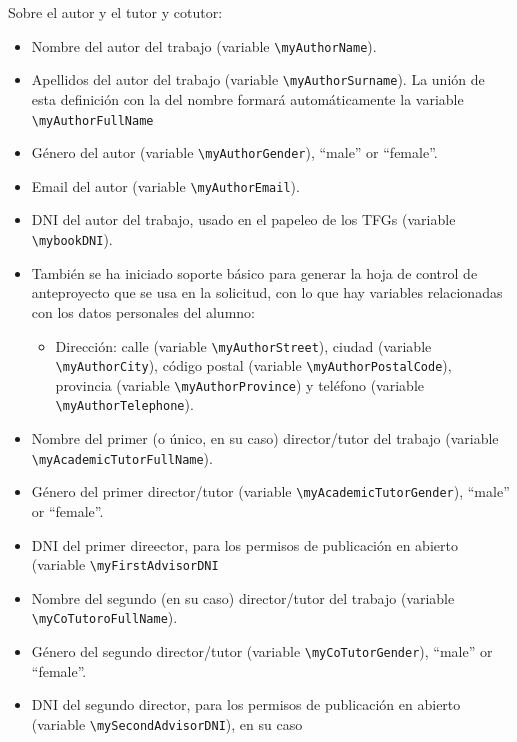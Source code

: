 \documentclass[spanish,openright]{book}
\begin{document}
Sobre el autor y el tutor y cotutor:

\begin{itemize}

\item Nombre del autor del trabajo (variable
\texttt{\textbackslash{}myAuthorName}).
\item Apellidos del autor del trabajo (variable
\texttt{\textbackslash{}myAuthorSurname}). La unión de esta
definición con la del nombre formará automáticamente la variable
\texttt{\textbackslash{}myAuthorFullName}
\item Género del autor (variable
\texttt{\textbackslash{}myAuthorGender}), ``male'' or ``female''.
\item Email del autor (variable
\texttt{\textbackslash{}myAuthorEmail}).
\item DNI del autor del trabajo, usado en el papeleo de los TFGs
(variable \texttt{\textbackslash{}mybookDNI}).

\item También se ha iniciado soporte básico para generar la hoja de
control de anteproyecto que se usa en la solicitud, con lo que hay
variables relacionadas con los datos personales del alumno:

\begin{itemize}
\item Dirección: calle (variable \texttt{\textbackslash{}myAuthorStreet}),
ciudad (variable \texttt{\textbackslash{}myAuthorCity}), código postal
(variable \texttt{\textbackslash{}myAuthorPostalCode}), provincia (variable
\texttt{\textbackslash{}myAuthorProvince}) y teléfono (variable
\texttt{\textbackslash{}myAuthorTelephone}).
\end{itemize}

\item Nombre del primer (o único, en su caso) director/tutor del trabajo
(variable \texttt{\textbackslash{}myAcademicTutorFullName}).
\item Género del primer director/tutor (variable
\texttt{\textbackslash{}myAcademicTutorGender}), ``male'' or
``female''.
\item DNI del primer direector, para los permisos de publicación en
abierto (variable \texttt{\textbackslash{}myFirstAdvisorDNI}


\item Nombre del segundo (en su caso) director/tutor del trabajo (variable
\texttt{\textbackslash{}myCoTutoroFullName}).
\item Género del segundo director/tutor (variable
\texttt{\textbackslash{}myCoTutorGender}), ``male'' or
``female''.
\item DNI del segundo director, para los permisos de publicación en
abierto (variable \texttt{\textbackslash{}mySecondAdvisorDNI}), en
su caso

\end{itemize}
\end{document}
